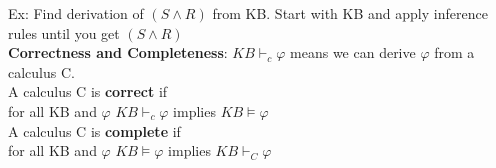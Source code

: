 Ex: Find derivation of $(S\wedge R)$ from KB. Start with KB and apply inference rules until you get $(S\wedge R)$ \\
\textbf{Correctness and Completeness}: $KB \vdash _{c} \varphi$ means we can derive $\varphi$ from a calculus C. \\
A calculus C is \textbf{correct} if \\ \makebox[1.2cm]{} for all KB and $\varphi$ $KB \vdash _{c} \varphi$ implies $KB \vDash \varphi$ \\
A calculus C is \textbf{complete} if \\ \makebox[1.2cm]{} for all KB and $\varphi$ $KB \vDash \varphi$ implies $KB \vdash _{C} \varphi$ \\
